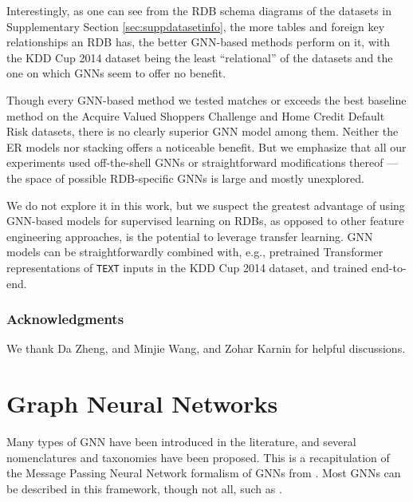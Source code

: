 \documentclass{article}
\begin{document}
Interestingly, as one can see from the RDB schema diagrams of the datasets in Supplementary Section \ref{sec:suppdatasetinfo}, the more tables and foreign key relationships an RDB has, the better GNN-based methods perform on it, with the KDD Cup 2014 dataset being the least ``relational'' of the datasets and the one on which GNNs seem to offer no benefit.

Though every GNN-based method we tested matches or exceeds the best baseline method on the Acquire Valued Shoppers Challenge and Home Credit Default Risk datasets, there is no clearly superior GNN model among them.  Neither the ER models nor stacking offers a noticeable benefit.  But we emphasize that all our experiments used off-the-shell GNNs or straightforward modifications thereof --- the space of possible RDB-specific GNNs is large and mostly unexplored.

We do not explore it in this work, but we suspect the greatest advantage of using GNN-based models for supervised learning on RDBs, as opposed to other feature engineering approaches, is the potential to leverage transfer learning.  GNN models can be straightforwardly combined with, e.g., pretrained Transformer representations of \texttt{TEXT} inputs in the KDD Cup 2014 dataset, and trained end-to-end.

\subsubsection*{Acknowledgments}

We thank Da Zheng, and Minjie Wang, and Zohar Karnin for helpful discussions.















\appendix

\section{Graph Neural Networks}\label{sec:suppGNNexplanation}

Many types of GNN have been introduced in the literature, and several nomenclatures and taxonomies have been proposed.  This is a recapitulation of the Message Passing Neural Network formalism of GNNs from \cite{gilmer_neural_2017}.  Most GNNs can be described in this framework, though not all, such as \cite{murphy2019relational}.
\end{document}
